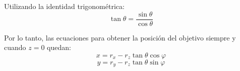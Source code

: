 \documentclass{book}
\begin{document}
Utilizando la identidad trigonométrica:
\[\tan{\theta} = \frac{\sin{\theta}}{\cos{\theta}}\]

Por lo tanto, las ecuaciones para obtener la posición del objetivo siempre y cuando $z=0$ quedan:
\[x=r_x - r_z \tan{\theta}  \cos{\varphi}\]
\[y=r_y - r_z \tan{\theta} \sin{\varphi}\]
%


\end{document}
